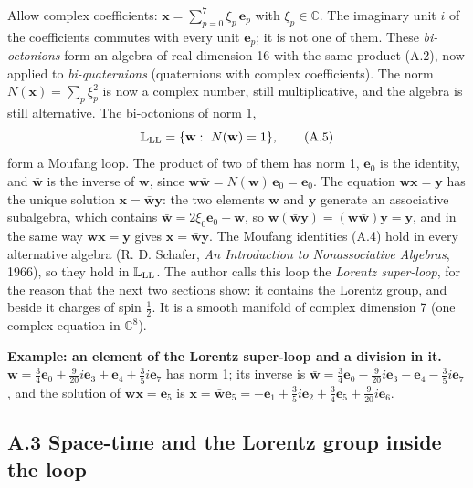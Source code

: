 \documentclass[
  10pt,
]{article}
\begin{document}
Allow complex coefficients: \(\mathbf x=\sum_{p=0}^7\xi_p\,\mathbf e_p\)
with \(\xi_p\in\mathbb C\). The imaginary unit \(i\) of the coefficients
commutes with every unit \(\mathbf e_p\); it is not one of them. These
\emph{bi-octonions} form an algebra of real dimension 16 with the same
product (A.2), now applied to \emph{bi-quaternions} (quaternions with
complex coefficients). The norm \(N(\mathbf x)=\sum_p\xi_p^2\) is now a
complex number, still multiplicative, and the algebra is still
alternative. The bi-octonions of norm 1,
\[\mathbb L_{\rm LL}=\{\mathbf w:\ N(\mathbf w)=1\},\tag{A.5}\] form a
Moufang loop. The product of two of them has norm 1, \(\mathbf e_0\) is
the identity, and \(\bar{\mathbf w}\) is the inverse of \(\mathbf w\),
since
\(\mathbf w\bar{\mathbf w}=N(\mathbf w)\,\mathbf e_0=\mathbf e_0\). The
equation \(\mathbf w\mathbf x=\mathbf y\) has the unique solution
\(\mathbf x=\bar{\mathbf w}\mathbf y\): the two elements \(\mathbf w\)
and \(\mathbf y\) generate an associative subalgebra, which contains
\(\bar{\mathbf w}=2\xi_0\mathbf e_0-\mathbf w\), so
\(\mathbf w(\bar{\mathbf w}\mathbf y)=(\mathbf w\bar{\mathbf w})\mathbf y=\mathbf y\),
and in the same way \(\mathbf w\mathbf x=\mathbf y\) gives
\(\mathbf x=\bar{\mathbf w}\mathbf y\). The Moufang identities (A.4)
hold in every alternative algebra (R. D. Schafer, \emph{An Introduction
to Nonassociative Algebras}, 1966), so they hold in
\(\mathbb L_{\rm LL}\). The author calls this loop the \emph{Lorentz
super-loop}, for the reason that the next two sections show: it contains
the Lorentz group, and beside it charges of spin \(\tfrac12\). It is a
smooth manifold of complex dimension 7 (one complex equation in
\(\mathbb C^8\)).

\textbf{Example: an element of the Lorentz super-loop and a division in
it.}
\(\mathbf w=\tfrac{3}{4}\mathbf e_{0}+\tfrac{9}{20}i\mathbf e_{3}+\mathbf e_{4}+\tfrac{3}{5}i\mathbf e_{7}\)
has norm 1; its inverse is
\(\bar{\mathbf w}=\tfrac{3}{4}\mathbf e_{0}-\tfrac{9}{20}i\mathbf e_{3}-\mathbf e_{4}-\tfrac{3}{5}i\mathbf e_{7}\),
and the solution of \(\mathbf w\mathbf x=\mathbf e_5\) is
\(\mathbf x=\bar{\mathbf w}\mathbf e_5=-\mathbf e_{1}+\tfrac{3}{5}i\mathbf e_{2}+\tfrac{3}{4}\mathbf e_{5}+\tfrac{9}{20}i\mathbf e_{6}\).

\hypertarget{a.3-space-time-and-the-lorentz-group-inside-the-loop}{%
\subsection{A.3 Space-time and the Lorentz group inside the
loop}\label{a.3-space-time-and-the-lorentz-group-inside-the-loop}}
\end{document}
